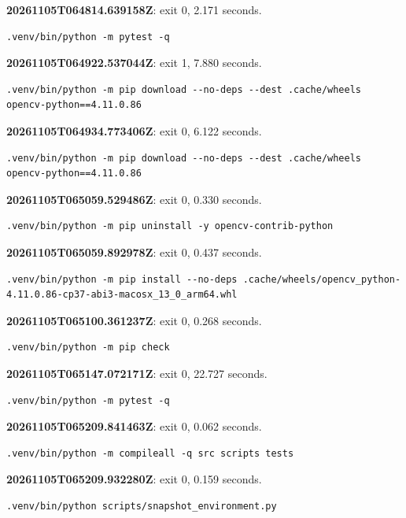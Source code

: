 \noindent\textbf{20261105T064814.639158Z}: exit 0, 2.171 seconds.
\begin{lstlisting}[numbers=none]
.venv/bin/python -m pytest -q
\end{lstlisting}

\noindent\textbf{20261105T064922.537044Z}: exit 1, 7.880 seconds.
\begin{lstlisting}[numbers=none]
.venv/bin/python -m pip download --no-deps --dest .cache/wheels opencv-python==4.11.0.86
\end{lstlisting}

\noindent\textbf{20261105T064934.773406Z}: exit 0, 6.122 seconds.
\begin{lstlisting}[numbers=none]
.venv/bin/python -m pip download --no-deps --dest .cache/wheels opencv-python==4.11.0.86
\end{lstlisting}

\noindent\textbf{20261105T065059.529486Z}: exit 0, 0.330 seconds.
\begin{lstlisting}[numbers=none]
.venv/bin/python -m pip uninstall -y opencv-contrib-python
\end{lstlisting}

\noindent\textbf{20261105T065059.892978Z}: exit 0, 0.437 seconds.
\begin{lstlisting}[numbers=none]
.venv/bin/python -m pip install --no-deps .cache/wheels/opencv_python-4.11.0.86-cp37-abi3-macosx_13_0_arm64.whl
\end{lstlisting}

\noindent\textbf{20261105T065100.361237Z}: exit 0, 0.268 seconds.
\begin{lstlisting}[numbers=none]
.venv/bin/python -m pip check
\end{lstlisting}

\noindent\textbf{20261105T065147.072171Z}: exit 0, 22.727 seconds.
\begin{lstlisting}[numbers=none]
.venv/bin/python -m pytest -q
\end{lstlisting}

\noindent\textbf{20261105T065209.841463Z}: exit 0, 0.062 seconds.
\begin{lstlisting}[numbers=none]
.venv/bin/python -m compileall -q src scripts tests
\end{lstlisting}

\noindent\textbf{20261105T065209.932280Z}: exit 0, 0.159 seconds.
\begin{lstlisting}[numbers=none]
.venv/bin/python scripts/snapshot_environment.py
\end{lstlisting}

